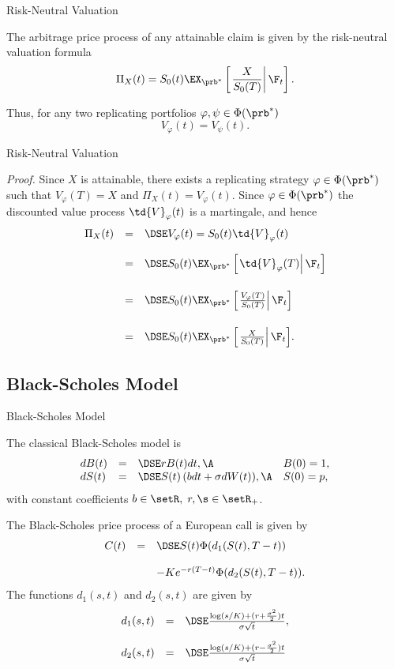 { Risk-Neutral Valuation}

The arbitrage price process of
any attainable claim is given by the risk-neutral valuation
formula
$$
\Pi_X(t) = S_0(t)
\EX_{\prb^*}\left[\left.\frac{X}{S_0(T)}\right|\F_t\right].
$$

Thus, for any two replicating portfolios $\varphi, \psi \in
\Phi(\prb^*)$
$$
V_\varphi(t) = V_\psi(t).
$$

{ Risk-Neutral Valuation}

{\it Proof.} Since $X$ is
attainable, there exists a replicating strategy $\varphi \in
\Phi(\prb^*)$ such that $V_\varphi(T) = X$ and $\Pi_X(t) =
V_\varphi(t)$. Since $\varphi \in \Phi(\prb^*)$ the discounted
value process $\td{V}_\varphi(t)$ is a martingale, and hence
$$
\begin{array}{lll}
\Pi_X(t) &=&\DSE V_\varphi(t) = S_0(t)\td{V}_\varphi(t) \\*[12pt]
&=&\DSE S_0(t) \EX_{\prb^*}
\left[\left.\td{V}_\varphi(T)\right|\F_t\right]\\*[18pt]
&=&\DSE S_0(t)
\EX_{\prb^*}
\left[\left.\frac{V_\varphi(T)}{S_0(T)}\right|\F_t\right]\\*[18pt]
&=&\DSE S_0(t) \EX_{\prb^*}
\left[\left.\frac{X}{S_0(T)}\right|\F_t\right]\!.
\end{array}
$$
\hfill \eb

\subsection{Black-Scholes Model}

{ Black-Scholes Model}

The classical Black-Scholes model is
$$
\begin{array}{llll}
dB(t) &=&\DSE r B(t) dt, \A &B(0)= 1,\\ dS(t) &=&\DSE S(t) \left(
b dt + \sigma dW(t) \right)\!, \A &S(0) = p,
\end{array}
$$
with constant coefficients $b \in \setR,\; r,\s \in \setR_+$.

The Black-Scholes price pro\-cess of a European call is given by
$$
\begin{array}{lll}
C(t) &=&\DSE S(t) \Phi(d_1(S(t), T-t))\\*[12pt] &&- K e^{-r(T-t)}
\Phi(d_2(S(t), T-t)).
\end{array}
$$
The functions $d_1(s,t)$ and $d_2(s,t)$ are given by
$$
\begin{array}{lll}
d_1(s,t) &=&\DSE \frac{\log(s/K) + (r +
\frac{\sigma^2}{2})t}{\sigma \sqrt{t}},\\*[12pt] d_2(s,t) &=&\DSE
 \frac{\log(s/K) + (r -
\frac{\sigma^2}{2})t}{\sigma \sqrt{t}}
\end{array}
$$

